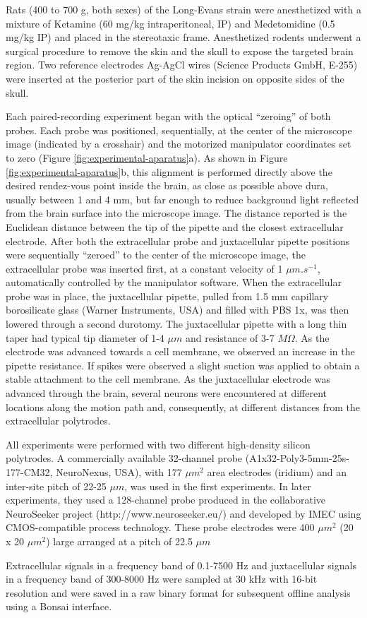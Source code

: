Rats (400 to 700 g, both sexes) of the Long-Evans strain were anesthetized with a mixture of Ketamine (60 mg/kg intraperitoneal, IP) and Medetomidine (0.5 mg/kg IP) and placed in the stereotaxic frame. Anesthetized rodents underwent a surgical procedure to remove the skin and the skull to expose the targeted brain region. Two reference electrodes Ag-AgCl wires (Science Products GmbH, E-255) were inserted at the posterior part of the skin incision on opposite sides of the skull.

Each paired-recording experiment began with the optical “zeroing” of both probes. Each probe was positioned, sequentially, at the center of the microscope image (indicated by a crosshair) and the motorized manipulator coordinates set to zero (Figure \ref{fig:experimental-aparatus}a). As shown in Figure \ref{fig:experimental-aparatus}b, this alignment is performed directly above the desired rendez-vous point inside the brain, as close as possible above dura, usually between 1 and 4 mm, but far enough to reduce background light reflected from the brain surface into the microscope image. The distance reported is the Euclidean distance between the tip of the pipette and the closest extracellular electrode. After both the extracellular probe and juxtacellular pipette positions were sequentially “zeroed” to the center of the microscope image, the extracellular probe was inserted first, at a constant velocity of 1 $\mu m.s^{-1}$, automatically controlled by the manipulator software. When the extracellular probe was in place, the juxtacellular pipette, pulled from 1.5 mm capillary borosilicate glass (Warner Instruments, USA) and filled with PBS 1x, was then lowered through a second durotomy. The juxtacellular pipette with a long thin taper had typical tip diameter of 1-4 $\mu m$ and resistance of 3-7 $M\Omega$. As the electrode was advanced towards a cell membrane, we observed an increase in the pipette resistance. If spikes were observed a slight suction was applied to obtain a stable attachment to the cell membrane. As the juxtacellular electrode was advanced through the brain, several neurons were encountered at different locations along the motion path and, consequently, at different distances from the extracellular polytrodes.

All experiments were performed with two different high-density silicon polytrodes. A commercially available 32-channel probe (A1x32-Poly3-5mm-25s-177-CM32, NeuroNexus, USA), with 177 $\mu m^2$ area electrodes (iridium) and an inter-site pitch of 22-25 $\mu m$, was used in the first experiments. In later experiments, they used a 128-channel probe produced in the collaborative NeuroSeeker project (http://www.neuroseeker.eu/) and developed by IMEC using CMOS-compatible process technology. These probe electrodes were 400 $\mu m^2$ (20 x 20 $\mu m^2$) large arranged at a pitch of 22.5 $\mu m$

Extracellular signals in a frequency band of 0.1-7500 Hz and juxtacellular signals in a frequency band of 300-8000 Hz were sampled at 30 kHz with 16-bit resolution and were saved in a raw binary format for subsequent offline analysis using a Bonsai interface.
